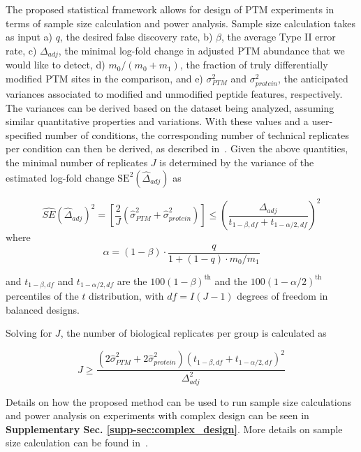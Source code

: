 \documentclass[mcp]{article}
\numberwithin{table}{section}
\begin{document}
The proposed statistical framework allows for design of PTM experiments in terms of sample size calculation and power analysis. 
Sample size calculation takes as input a) $q$, the desired false discovery rate, b) $\beta$, the average Type II error rate, c) $\Delta_{adj}$, the minimal log-fold change in adjusted PTM abundance that we would like to detect, d) $m_0 / (m_0 + m_1)$, the fraction of truly differentially modified PTM sites in the comparison, and e) $\sigma_{PTM}^{2}$ and $\sigma_{protein}^{2}$, the anticipated variances associated to modified and unmodified peptide features, respectively. The variances can be derived based on the dataset being analyzed, assuming similar quantitative properties and variations. With these values and a user-specified number of conditions, the corresponding number of technical replicates per condition can then be derived, as described in~\cite{kutner_etal_04a}. Given the above quantities, the minimal number of replicates $J$ is determined by the variance of the estimated log-fold change $\mathrm{SE}^{2}(\hat{\Delta}_{adj})$ as

\begin{equation}
\widehat{SE}(\hat{\Delta}_{adj})^2 = \left[ \frac{2}{J} \left( \hat{\sigma}_{PTM}^{2} + \hat{\sigma}_{protein}^{2} \right) \right]
\leq \left( \frac{\Delta_{adj}}{t_{1-\beta, df} + t_{1-\alpha /2, df}} \right)^{2}
\end{equation}
where 
\begin{equation}
\alpha = (1 - \beta) \cdot \frac{q}{1 + (1-q) \cdot m_0 / m_1}
\end{equation}

and $t_{1-\beta, df}$ and $t_{1-\alpha /2, df}$ are the $100(1-\beta)^{\text{th}}$ and the $100(1-\alpha /2)^{\text{th}}$ percentiles of the $t$ distribution, with $df = I(J-1)$ degrees of freedom in balanced designs. 

Solving for $J$, the number of biological replicates per group is calculated as 

\begin{equation}
J \geq \frac{(2\hat{\sigma}_{PTM}^{2} + 2\hat{\sigma}_{protein}^{2})(t_{1-\beta, df} + t_{1-\alpha /2, df})^2}{\Delta_{adj}^2}
\end{equation}

Details on how the proposed method can be used to run sample size calculations and power analysis on experiments with complex design can be seen in {\bf Supplementary Sec. \ref{supp-sec:complex_design}}. More details on sample size calculation can be found in~\cite{oberg_vitek_09a}. 
\end{document}
